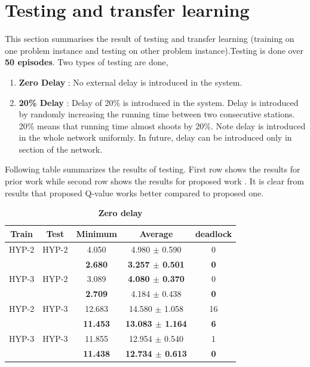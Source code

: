\section{Testing and transfer learning}

This section summarises the result of testing and transfer learning (training on one problem instance 
and testing on other problem instance).Testing is done over \textbf{50 episodes}.
Two types of testing are done,
\begin{enumerate}
    \item \textbf{Zero Delay} : No external delay is introduced in the system.
    \item \textbf{20\% Delay} : Delay of 20\% is introduced in the system. Delay is introduced by 
                                randomly increasing the running time between two consecutive stations. 
                                20\% means that running time almost shoots by 20\%. Note delay is introduced in 
                                the whole network uniformly. In future, delay can be introduced only in section of the 
                                network.
\end{enumerate}
Following table summarizes the results of testing. First row shows the results for prior work while 
second row shows the results for proposed work . It is clear from results that proposed Q-value works better
compared to proposed one.

\vspace{2in}

\begin{table}[H]
\centering
\caption{\textbf{Zero delay}}    
    \begin{tabular}{ c c c c c } 
     \hline
     \textbf{Train} & \textbf{Test} & \textbf{Minimum} & \textbf{Average} & \textbf{deadlock} \\ 
     \hline
     \hline
     HYP-2 & HYP-2 & 4.050 & 4.980 $\pm$ 0.590 & 0 \\
     & & \textbf{2.680} & \textbf{3.257 $\pm$ 0.501} & \textbf{0} \\
    
     HYP-3 & HYP-2 & 3.089 & \textbf{4.080 $\pm$ 0.370} & 0 \\
     & & \textbf{2.709} & 4.184 $\pm$ 0.438 & \textbf{0} \\
    
     HYP-2 & HYP-3 & 12.683 & 14.580 $\pm$ 1.058 & 16 \\
     & & \textbf{11.453} & \textbf{13.083 $\pm$ 1.164} & \textbf{6} \\
    

     HYP-3 & HYP-3 & 11.855 & 12.954 $\pm$ 0.540 & 1 \\
     & & \textbf{11.438} & \textbf{12.734 $\pm$ 0.613} & \textbf{0} \\
     \hline
    \end{tabular}
\end{table}


